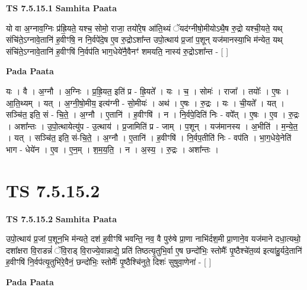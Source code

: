 \documentclass[17pt]{extarticle}
\begin{document}
\textbf{TS 7.5.15.1 } \newline
\textbf{Samhita Paata} \newline

यो वा अ॒ग्नाव॒ग्निः प्र॑ह्रि॒यते॒ यश्च॒ सोमो॒ राजा॒ तयो॑रे॒ष आ॑ति॒थ्यं ॅयद॑ग्नीषो॒मीयोऽथै॒ष रु॒द्रो यश्ची॒यते॒ यथ् संचि॑ते॒ऽग्नावे॒तानि॑ ह॒वीꣳषि॒ न नि॒र्वपे॑दे॒ष ए॒व रु॒द्रोऽशा᳚न्त उपो॒त्थाय॑ प्र॒जां प॒शून् यज॑मानस्या॒भि म॑न्येत॒ यथ् संचि॑ते॒ऽग्नावे॒तानि॑ ह॒वीꣳषि॑ नि॒र्वप॑ति भाग॒धेये॑नै॒वैनꣳ॑ शमयति॒ नास्य॑ रु॒द्रोऽशा᳚न्त - [  ] \newline

\textbf{Pada Paata} \newline

यः । वै । अ॒ग्नौ । अ॒ग्निः । प्र॒ह्रि॒यत॒ इति॑ प्र - ह्रि॒यते᳚ । यः । च॒ । सोमः॑ । राजा᳚ । तयोः᳚ । ए॒षः । आ॒ति॒थ्यम् । यत् । अ॒ग्नी॒षो॒मीय॒ इत्य॑ग्नी - सो॒मीयः॑ । अथ॑ । ए॒षः । रु॒द्रः । यः । ची॒यते᳚ । यत् । सञ्चि॑त॒ इति॒ सं - चि॒ते॒ । अ॒ग्नौ । ए॒तानि॑ । ह॒वीꣳषि॑ । न । नि॒र्वपे॒दिति॑ निः - वपे᳚त् । ए॒षः । ए॒व । रु॒द्रः । अशा᳚न्तः । उ॒पो॒त्थायेत्यु॑प - उ॒त्थाय॑ । प्र॒जामिति॑ प्र - जाम् । प॒शून् । यज॑मानस्य । अ॒भीति॑ । म॒न्ये॒त॒ । यत् । सञ्चि॑त॒ इति॒ सं-चि॒ते॒ । अ॒ग्नौ । ए॒तानि॑ । ह॒वीꣳषि॑ । नि॒र्वप॒तीति॑ निः - वप॑ति । भा॒ग॒धेये॒नेति॑ भाग - धेये॑न । ए॒व । ए॒न॒म् । श॒म॒य॒ति॒ । न । अ॒स्य॒ । रु॒द्रः । अशा᳚न्तः ।  \newline





\section{ TS 7.5.15.2 }

\textbf{TS 7.5.15.2 } \newline
\textbf{Samhita Paata} \newline

उपो॒त्थाय॑ प्र॒जां प॒शून॒भि म॑न्यते॒ दश॑ ह॒वीꣳषि॑ भवन्ति॒ नव॒ वै पुरु॑षे प्रा॒णा नाभि॑र्दश॒मी प्रा॒णाने॒व यज॑माने दधा॒त्यथो॒ दशा᳚क्षरा वि॒राडन्नं॑ ॅवि॒राड् वि॒राज्ये॒वान्नाद्ये॒ प्रति॑ तिष्ठत्यृ॒तुभि॒र्वा ए॒ष छन्दो॑भिः॒ स्तोमैः᳚ पृ॒ष्ठैश्चे॑त॒व्य॑ इत्या॑हु॒र्यदे॒तानि॑ ह॒वीꣳषि॑ नि॒र्वप॑त्यृ॒तुभि॑रे॒वैनं॒ छन्दो॑भिः॒ स्तोमैः᳚ पृ॒ष्ठैश्चि॑नुते॒ दिशः॑ सुषुवा॒णेना॑ - [  ] \newline

\textbf{Pada Paata} \newline
\end{document}
